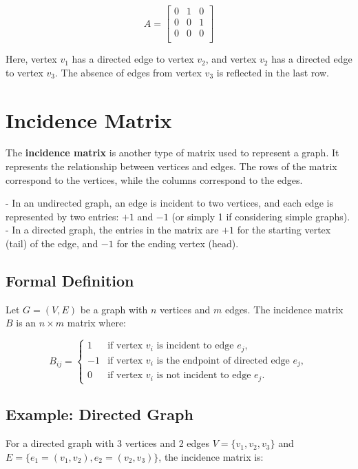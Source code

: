 \documentclass{book}
\begin{document}
\[
A = \begin{bmatrix}
0 & 1 & 0 \\
0 & 0 & 1 \\
0 & 0 & 0 \\
\end{bmatrix}
\]

Here, vertex \(v_1\) has a directed edge to vertex \(v_2\), and vertex \(v_2\) has a directed edge to vertex \(v_3\). The absence of edges from vertex \(v_3\) is reflected in the last row.

\section{Incidence Matrix}

The \textbf{incidence matrix} is another type of matrix used to represent a graph. It represents the relationship between vertices and edges. The rows of the matrix correspond to the vertices, while the columns correspond to the edges.

- In an undirected graph, an edge is incident to two vertices, and each edge is represented by two entries: \(+1\) and \(-1\) (or simply 1 if considering simple graphs).
- In a directed graph, the entries in the matrix are \(+1\) for the starting vertex (tail) of the edge, and \(-1\) for the ending vertex (head).

\subsection{Formal Definition}

Let \( G = (V, E) \) be a graph with \(n\) vertices and \(m\) edges. The incidence matrix \(B\) is an \(n \times m\) matrix where:

\[
B_{ij} =
\begin{cases}
1 & \text{if vertex } v_i \text{ is incident to edge } e_j, \\
-1 & \text{if vertex } v_i \text{ is the endpoint of directed edge } e_j, \\
0 & \text{if vertex } v_i \text{ is not incident to edge } e_j.
\end{cases}
\]

\subsection{Example: Directed Graph}

For a directed graph with 3 vertices and 2 edges \(V = \{v_1, v_2, v_3\}\) and \(E = \{e_1 = (v_1, v_2), e_2 = (v_2, v_3)\}\), the incidence matrix is:
\end{document}
